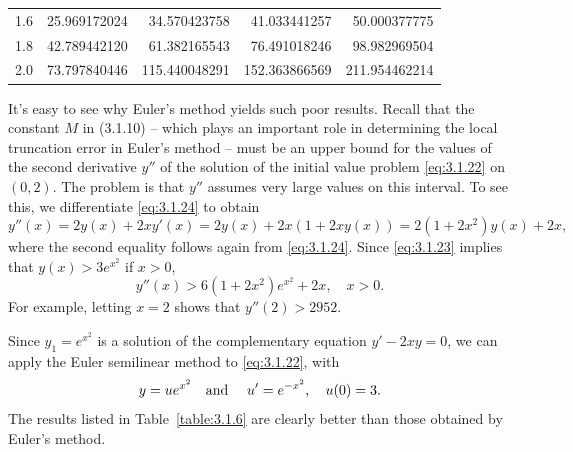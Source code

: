 \begin{examplesolution}
\begin{newtable}
\begin{center}
\begin{tabular}{|c|r|r|r|r|}
      1.6                       & 25.969172024                  & 34.570423758                  & 41.033441257                   & 50.000377775                    \\
      1.8                       & 42.789442120                  & 61.382165543                  & 76.491018246                   & 98.982969504                    \\
      2.0                       & 73.797840446                  & 115.440048291                 & 152.363866569                  & 211.954462214                   \\
      \hline
    \end{tabular}
  \end{center}
\end{newtable}

It's easy to see why Euler's method yields such poor results. Recall that the constant $M$ in
\textup{(3.1.10)} -- which plays an important role in determining the local truncation error in
Euler's method -- must be an upper bound for the values of the second derivative $y''$ of the
solution of the initial value problem \eqref{eq:3.1.22} on $(0,2)$. The problem is that $y''$
assumes very large values on this interval. To see this, we differentiate \eqref{eq:3.1.24} to
obtain
\[
  y''(x)=2y(x)+2xy'(x)=2y(x)+2x(1+2xy(x))=2(1+2x^{2})y(x)+2x,
\]
where the second equality follows again from \eqref{eq:3.1.24}. Since \eqref{eq:3.1.23} implies that
$y(x)>3e^{x^{2}}$ if $x>0$,
\[
  y''(x)>6(1+2x^{2})e^{x^{2}}+2x,\quad x>0.
\]
For example, letting $x=2$ shows that $y''(2)>2952$.

 Since $y_{1}=e^{x^{2}}$ is a solution of the complementary equation $y'-2xy=0$, we
can apply the Euler semilinear method to \eqref{eq:3.1.22}, with
\[
  y=ue^{x^{2}}\mbox{\quad and \quad}u'=e^{-x^{2}},\quad u(0)=3.
\]
The results listed in Table~\ref{table:3.1.6} are clearly better than those obtained by Euler's
method.


\end{examplesolution}
